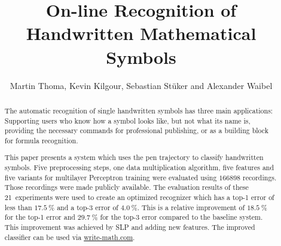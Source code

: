 \documentclass[9pt,technote,a4paper]{IEEEtran}
\title{On-line Recognition of Handwritten Mathematical Symbols}
\author{Martin Thoma, Kevin Kilgour, Sebastian St{\"u}ker and Alexander Waibel}
\begin{document}
\maketitle
\begin{abstract}
The automatic recognition of single handwritten symbols has three main
applications: Supporting users who know how a symbol looks like, but not what
its name is, providing the necessary commands for professional publishing, or
as a building block for formula recognition.

This paper presents a system which uses the pen trajectory to classify
handwritten symbols. Five preprocessing steps, one data multiplication
algorithm, five features and five variants for multilayer Perceptron training
were evaluated using $\num{166898}$ recordings. Those recordings were made
publicly available. The evaluation results of these 21~experiments were used to
create an optimized recognizer which has a top-1 error of less than
$\SI{17.5}{\percent}$ and a top-3 error of $\SI{4.0}{\percent}$. This is a
relative improvement of $\SI{18.5}{\percent}$ for the top-1 error and
$\SI{29.7}{\percent}$ for the top-3 error compared to the baseline system. This
improvement was achieved by \acrlong{SLP} and adding new features. The
improved classifier can be used via \href{http://write-math.com/}{write-math.com}.
\end{abstract}












\end{document}
